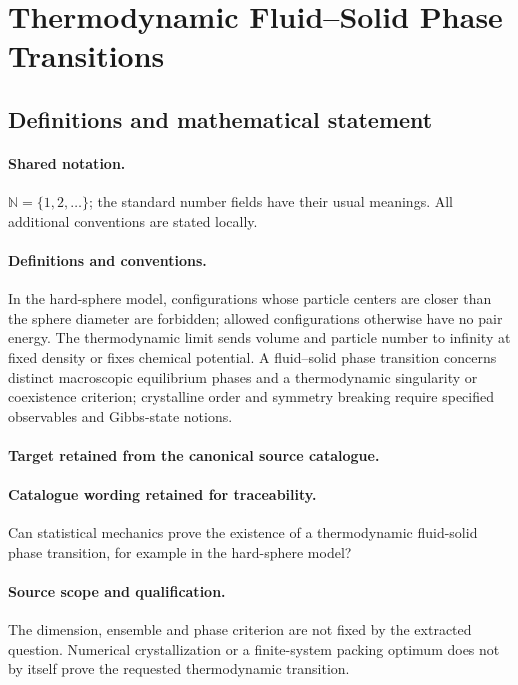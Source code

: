 \documentclass[11pt]{article}
\begin{document}
\section{Thermodynamic Fluid–Solid Phase Transitions}\label{statement}

\subsection{Definitions and mathematical statement}

\paragraph{Shared notation.}$\mathbb N=\{1,2,\ldots\}$; the standard number fields have their usual meanings. All additional conventions are stated locally.


\paragraph{Definitions and conventions.}
In the hard-sphere model, configurations whose particle centers are closer than the sphere diameter are forbidden; allowed configurations otherwise have no pair energy. The thermodynamic limit sends volume and particle number to infinity at fixed density or fixes chemical potential. A fluid--solid phase transition concerns distinct macroscopic equilibrium phases and a thermodynamic singularity or coexistence criterion; crystalline order and symmetry breaking require specified observables and Gibbs-state notions.

\paragraph{Target retained from the canonical source catalogue.}
\paragraph{Catalogue wording retained for traceability.}
Can statistical mechanics prove the existence of a thermodynamic fluid-solid phase transition, for example in the hard-sphere model?

\paragraph{Source scope and qualification.}
The dimension, ensemble and phase criterion are not fixed by the extracted question. Numerical crystallization or a finite-system packing optimum does not by itself prove the requested thermodynamic transition.
\end{document}
